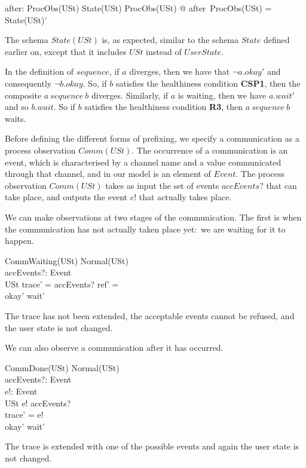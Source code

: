 \documentclass{article}
\begin{document}
\begin{axdef}
  after: ProcObs(USt) \fun State(USt)
  \where %
  \forall ProcObs(USt) @ after\ \theta ProcObs(USt) = \theta
  State(USt)'
\end{axdef}
The schema $State(USt)$ is, as expected, similar to the schema $State$
defined earlier on, except that it includes $USt$ instead of
$UserState$.

In the definition of $sequence$, if $a$ diverges, then we have that
$\lnot a.okay'$ and consequently $\lnot b.okay$.  So, if $b$ satisfies
the healthiness condition \textbf{CSP1}, then the composite
$a~sequence~b$ diverges.  Similarly, if $a$ is waiting, then we have
$a.wait'$ and so $b.wait$.  So if $b $ satisfies the healthiness
condition \textbf{R3}, then $a~sequence~b$ waits.

Before defining the different forms of prefixing, we specify a
communication as a process observation $Comm(USt)$.  The occurrence of
a communication is an event, which is characterised by a channel name
and a value communicated through that channel, and in our model is an
element of $Event$.  The process observation $Comm(USt)$ takes as
input the set of events $accEvents?$ that can take place, and outputs
the event $e!$ that actually takes place.

We can make observations at two stages of the communication. The first
is when the communication has not actually taken place yet:~we are
waiting for it to happen.
\begin{schema}{CommWaiting(USt)}
  Normal(USt)
  \\ %
  accEvents?: \power Event
  \\ %
  \Xi USt
  \where %
  trace' = \langle\rangle \land accEvents? \cap ref' = \emptyset
  \\ %
  okay' \land wait'
\end{schema}
The trace has not been extended, the acceptable events cannot be
refused, and the user state is not changed.

We can also observe a communication after it has occurred.
\begin{schema}{CommDone(USt)}
  Normal(USt)
  \\ %
  accEvents?: \power Event
  \\ %
  e!: Event
  \\ %
  \Xi USt
  \where %
  e! \in accEvents?
  \\ %
  trace' = \langle e! \rangle
  \\ %
  okay' \land \lnot wait'
\end{schema}
The trace is extended with one of the possible events and again the
user state is not changed.
\end{document}
